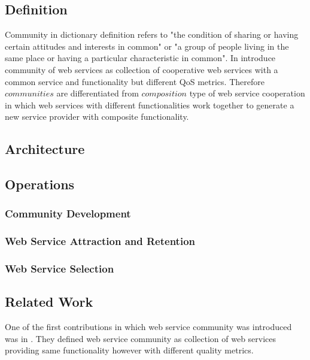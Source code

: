         \subsection{Definition}\label{sec:CWSDefinition}
        Community in dictionary definition refers to "the condition of sharing or having certain attitudes and interests in common" or "a group of people living in the same place or having a particular characteristic in common". In \cite{DBLP:journals/internet/BenatallahSD03, Zeng:2003:QDW:775152.775211} introduce community of web services as collection of cooperative web services with a common service and functionality but different QoS metrics. Therefore $communities$ are differentiated from $composition$ type of web service cooperation in which web services with different functionalities work together to generate a new service provider with composite functionality.
        
        \subsection{Architecture}\label{sec:CWSArchitecture}

        \subsection{Operations}\label{sec:CWSOperations}

            \subsubsection{Community Development}\label{sec:CWSCommunityDev}

            \subsubsection{Web Service Attraction and Retention}\label{sec:CWSAttraction}

            \subsubsection{Web Service Selection}\label{sec:CWSSelection}
            
        \subsection{Related Work}\label{sec:BRRelatedWork}


One of the first contributions in which web service community was introduced was in \cite{Zeng:2003:QDW:775152.775211}. They defined web service community as collection of web services providing same functionality however with different quality metrics. 

